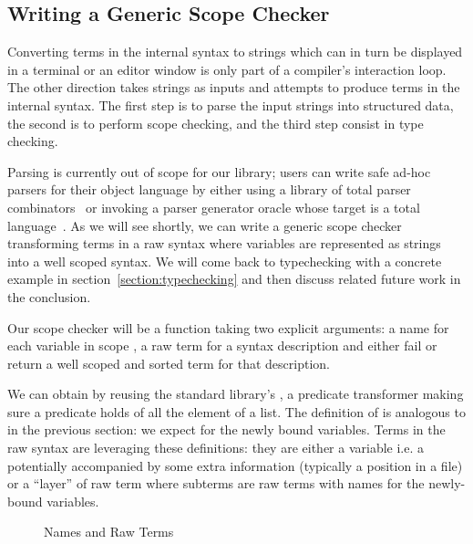 \subsection{Writing a Generic Scope Checker}\label{section:genericscoping}

Converting terms in the internal syntax to strings which can in turn be
displayed in a terminal or an editor window is only part of a compiler's
interaction loop. The other direction takes strings as inputs and attempts to
produce terms in the internal syntax. The first step is to parse the input
strings into structured data, the second is to perform scope checking,
and the third step consist in type checking.

Parsing is currently out of scope for our library; users can write safe
ad-hoc parsers for their object language by either using a library of total
parser combinators~\cite{DBLP:conf/icfp/Danielsson10,allais2018agdarsec}
or invoking a parser generator oracle whose target is a total
language~\cite{Stump:2016:VFP:2841316}. As we will see shortly, we can
write a generic scope checker transforming terms in a raw syntax where
variables are represented as strings into a well scoped syntax. We will
come back to typechecking with a concrete example in section~\ref{section:typechecking}
and then discuss related future work in the conclusion.

Our scope checker will be a function taking two explicit arguments: a name for
each variable in scope , a raw term for a syntax description  and
either fail or return a well scoped and sorted term for that description.


We can obtain  by reusing the standard library's , a predicate
transformer making sure a predicate holds of all the element of a list. The
definition of  is analogous to  in the previous section:
we expect  for the newly bound variables. Terms in the raw syntax are
leveraging these definitions: they are either a variable i.e. a 
potentially accompanied by some extra information  (typically a position in
a file) or a ``layer'' of raw term where subterms are raw terms with names for the
newly-bound variables.

\begin{figure}[h]
\begin{minipage}{0.35\textwidth}
\end{minipage}
\begin{minipage}{0.55\textwidth}
\end{minipage}
\caption{Names and Raw Terms}
\end{figure}

